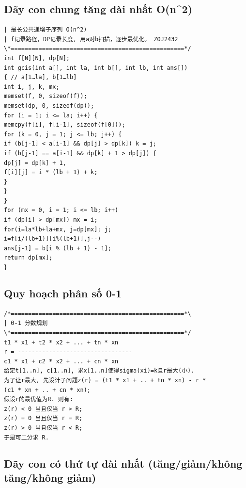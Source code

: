 \documentclass[11pt]{article}
\begin{document}
\subsection{Dãy con chung tăng dài nhất O(n\textasciicircum{}2)}

\begingroup
\scriptsize
\begin{verbatim}
| 最长公共递增子序列 O(n^2)
| f记录路径，DP记录长度, 用a对b扫描，逐步最优化。 ZOJ2432
\*==================================================*/
int f[N][N], dp[N];
int gcis(int a[], int la, int b[], int lb, int ans[])
{ // a[1…la], b[1…lb]
int i, j, k, mx;
memset(f, 0, sizeof(f));
memset(dp, 0, sizeof(dp));
for (i = 1; i <= la; i++) {
memcpy(f[i], f[i-1], sizeof(f[0]));
for (k = 0, j = 1; j <= lb; j++) {
if (b[j-1] < a[i-1] && dp[j] > dp[k]) k = j;
if (b[j-1] == a[i-1] && dp[k] + 1 > dp[j]) {
dp[j] = dp[k] + 1,
f[i][j] = i * (lb + 1) + k;
}
}
}
for (mx = 0, i = 1; i <= lb; i++)
if (dp[i] > dp[mx]) mx = i;
for(i=la*lb+la+mx, j=dp[mx]; j;
i=f[i/(lb+1)][i%(lb+1)],j--)
ans[j-1] = b[i % (lb + 1) - 1];
return dp[mx];
}
\end{verbatim}
\endgroup

\subsection{Quy hoạch phân số 0-1}

\begingroup
\scriptsize
\begin{verbatim}
/*==================================================*\
| 0-1 分数规划
\*==================================================*/
t1 * x1 + t2 * x2 + ... + tn * xn
r = ---------------------------------
c1 * x1 + c2 * x2 + ... + cn * xn
给定t[1..n], c[1..n], 求x[1..n]使得sigma(xi)=k且r最大(小).
为了让r最大, 先设计子问题z(r) = (t1 * x1 + .. + tn * xn) - r *
(c1 * xn + .. + cn * xn);
假设r的最优值为R. 则有:
z(r) < 0 当且仅当 r > R;
z(r) = 0 当且仅当 r = R;
z(r) > 0 当且仅当 r < R;
于是可二分求 R.
\end{verbatim}
\endgroup

\subsection{Dãy con có thứ tự dài nhất (tăng/giảm/không tăng/không giảm)}
\end{document}
